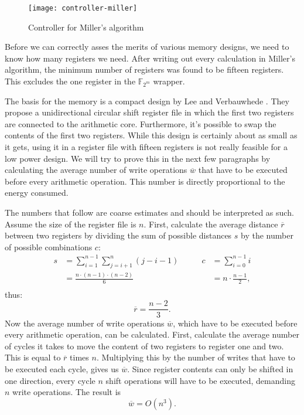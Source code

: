 \begin{figure}[h]
	\centering
		\texttt{[image: controller-miller]}
		\caption{Controller for Miller's algorithm\label{figure-controller}}
\end{figure}

Before we can correctly asses the merits of various memory designs, we need to know how many registers we need. After writing out every calculation in Miller's algorithm, the minimum number of registers was found to be fifteen registers. This excludes the one register in the $\mathbb{F}_{2^m}$ wrapper. 

The basis for the memory is a compact design by Lee and Verbauwhede \cite{lee}. They propose a unidirectional circular shift register file in which the first two registers are connected to the arithmetic core. Furthermore, it's possible to swap the contents of the first two registers. While this design is certainly about as small as it gets, using it in a register file with fifteen registers is not really feasible for a low power design. We will try to prove this in the next few paragraphs by calculating the average number of write operations $\overline{w}$ that have to be executed before every arithmetic operation. This number is directly proportional to the energy consumed.

The numbers that follow are coarse estimates and should be interpreted as such. Assume the size of the register file is $n$. First, calculate the average distance $\overline{r}$ between two registers by dividing the sum of possible distances $s$ by the number of possible combinations $c$:
\begin{displaymath}\begin{aligned}
	s	&= \sum_{i = 1}^{n - 1} \sum_{j = i + 1}^n (j - i - 1)
		&\qquad c	&= \sum_{i = 0}^{n - 1} i\\
		&= \frac{n \cdot (n - 1) \cdot (n - 2)}{6}
		&	&= n \cdot \frac{n - 1}{2},\\
\end{aligned}\end{displaymath}
thus:
\begin{displaymath}\overline{r}	= \frac{n - 2}{3}.\end{displaymath}
Now the average number of write operations $\overline{w}$, which have to be executed before every arithmetic operation, can be calculated. First, calculate the average number of cycles it takes to move the content of two registers to register one and two. This is equal to $\overline{r}$ times $n$. Multiplying this by the number of writes that have to be executed each cycle, gives us $\overline w$. Since register contents can only be shifted in one direction, every cycle $n$ shift operations will have to be executed, demanding $n$ write operations. The result is
\begin{displaymath}
	\overline{w} = O ( n^3 ).
\end{displaymath}

